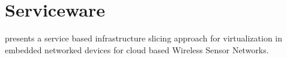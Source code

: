 \section{Serviceware}
\cite{6529470} presents a service based infrastructure slicing approach for virtualization in embedded networked devices for cloud based Wireless Sensor Networks. 